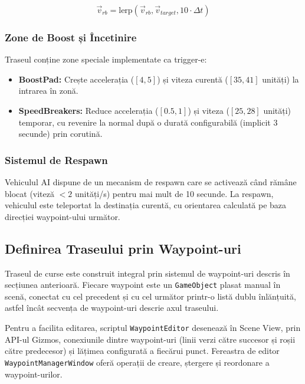 \begin{equation}
    \vec{v}_{rb} = \text{lerp}(\vec{v}_{rb}, \vec{v}_{target}, 10 \cdot \Delta t)
\end{equation}

\subsubsection{Zone de Boost și Încetinire}

Traseul conține zone speciale implementate ca trigger-e:

\begin{itemize}
    \item \textbf{BoostPad:} Crește accelerația ($[4, 5]$) și viteza curentă ($[35, 41]$ unități) la intrarea în zonă.
    \item \textbf{SpeedBreakers:} Reduce accelerația ($[0.5, 1]$) și viteza ($[25, 28]$ unități) temporar, cu revenire la normal după o durată configurabilă (implicit 3 secunde) prin corutină.
\end{itemize}

\subsubsection{Sistemul de Respawn}

Vehiculul AI dispune de un mecanism de respawn care se activează când rămâne blocat (viteză $< 2$ unități/s) pentru mai mult de 10 secunde. La respawn, vehiculul este teleportat la destinația curentă, cu orientarea calculată pe baza direcției waypoint-ului următor.

\subsection{Definirea Traseului prin Waypoint-uri}

Traseul de curse este construit integral prin sistemul de waypoint-uri descris în secțiunea anterioară. Fiecare waypoint este un \texttt{GameObject} plasat manual în scenă, conectat cu cel precedent și cu cel următor printr-o listă dublu înlănțuită, astfel încât secvența de waypoint-uri descrie axul traseului.

Pentru a facilita editarea, scriptul \texttt{WaypointEditor} desenează în Scene View, prin API-ul Gizmos, conexiunile dintre waypoint-uri (linii verzi către succesor și roșii către predecesor) și lățimea configurată a fiecărui punct. Fereastra de editor \texttt{WaypointManagerWindow} oferă operații de creare, ștergere și reordonare a waypoint-urilor.

